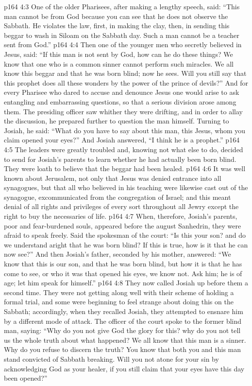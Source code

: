 \vs p164 4:3 One of the older Pharisees, after making a lengthy speech, said: “This man cannot be from God because you can see that he does not observe the Sabbath. He violates the law, first, in making the clay, then, in sending this beggar to wash in Siloam on the Sabbath day. Such a man cannot be a teacher sent from God.”
\vs p164 4:4 Then one of the younger men who secretly believed in Jesus, said: “If this man is not sent by God, how can he do these things? We know that one who is a common sinner cannot perform such miracles. We all know this beggar and that he was born blind; now he sees. Will you still say that this prophet does all these wonders by the power of the prince of devils?” And for every Pharisee who dared to accuse and denounce Jesus one would arise to ask entangling and embarrassing questions, so that a serious division arose among them. The presiding officer saw whither they were drifting, and in order to allay the discussion, he prepared further to question the man himself. Turning to Josiah, he said: “What do you have to say about this man, this Jesus, whom you claim opened your eyes?” And Josiah answered, “I think he is a prophet.”
\vs p164 4:5 The leaders were greatly troubled and, knowing not what else to do, decided to send for Josiah’s parents to learn whether he had actually been born blind. They were loath to believe that the beggar had been healed.
\vs p164 4:6 It was well known about Jerusalem, not only that Jesus was denied entrance into all synagogues, but that all who believed in his teaching were likewise cast out of the synagogue, excommunicated from the congregation of Israel; and this meant denial of all rights and privileges of every sort throughout all Jewry except the right to buy the necessaries of life.
\vs p164 4:7 When, therefore, Josiah’s parents, poor and fear\hyp{}burdened souls, appeared before the august Sanhedrin, they were afraid to speak freely. Said the spokesman of the court: “Is this your son? and do we understand aright that he was born blind? If this is true, how is it that he can now see?” And then Josiah’s father, seconded by his mother, answered: “We know that this is our son, and that he was born blind, but how it is that he has come to see, or who it was that opened his eyes, we know not. Ask him; he is of age; let him speak for himself.”
\vs p164 4:8 They now called Josiah up before them a second time. They were not getting along well with their scheme of holding a formal trial, and some were beginning to feel strange about doing this on the Sabbath; accordingly, when they recalled Josiah, they attempted to ensnare him by a different mode of attack. The officer of the court spoke to the former blind man, saying: “Why do you not give God the glory for this? why do you not tell us the whole truth about what happened? We all know that this man is a sinner. Why do you refuse to discern the truth? You know that both you and this man stand convicted of Sabbath breaking. Will you not atone for your sin by acknowledging God as your healer, if you still claim that your eyes have this day been opened?”
